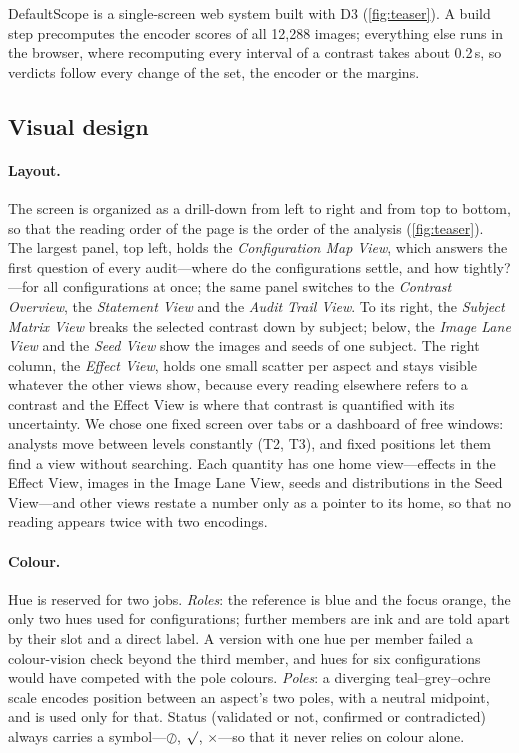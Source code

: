 \documentclass[review]{vgtc}                 %
\newcommand{\sysname}{DefaultScope}
\begin{document}
\sysname{} is a single-screen web system built with D3 (\cref{fig:teaser}). A build step precomputes the encoder scores of all 12,288 images; everything else runs in the browser, where recomputing every interval of a contrast takes about 0.2\,s, so verdicts follow every change of the set, the encoder or the margins.

\subsection{Visual design}
\label{sec:design}

\paragraph{Layout.}
The screen is organized as a drill-down from left to right and from top to bottom, so that the reading order of the page is the order of the analysis (\cref{fig:teaser}). The largest panel, top left, holds the \emph{Configuration Map View}, which answers the first question of every audit---where do the configurations settle, and how tightly?---for all configurations at once; the same panel switches to the \emph{Contrast Overview}, the \emph{Statement View} and the \emph{Audit Trail View}. To its right, the \emph{Subject Matrix View} breaks the selected contrast down by subject; below, the \emph{Image Lane View} and the \emph{Seed View} show the images and seeds of one subject. The right column, the \emph{Effect View}, holds one small scatter per aspect and stays visible whatever the other views show, because every reading elsewhere refers to a contrast and the Effect View is where that contrast is quantified with its uncertainty. We chose one fixed screen over tabs or a dashboard of free windows: analysts move between levels constantly (T2, T3), and fixed positions let them find a view without searching. Each quantity has one home view---effects in the Effect View, images in the Image Lane View, seeds and distributions in the Seed View---and other views restate a number only as a pointer to its home, so that no reading appears twice with two encodings.

\paragraph{Colour.}
Hue is reserved for two jobs. \emph{Roles}: the reference is blue and the focus orange, the only two hues used for configurations; further members are ink and are told apart by their slot and a direct label. A version with one hue per member failed a colour-vision check beyond the third member, and hues for six configurations would have competed with the pole colours. \emph{Poles}: a diverging teal--grey--ochre scale encodes position between an aspect's two poles, with a neutral midpoint, and is used only for that. Status (validated or not, confirmed or contradicted) always carries a symbol---$\oslash$, $\surd$, $\times$---so that it never relies on colour alone.
\end{document}
